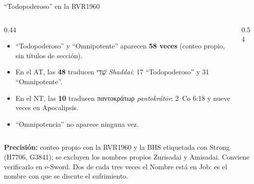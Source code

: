 \documentclass[hyperref={bookmarks=false},aspectratio=169]{beamer}
\newcommand{\heb}[1]{\mbox{\foreignlanguage{hebrew}{#1}}}
\newcommand{\grc}[1]{\foreignlanguage{ancientgreek}{#1}}
\newcommand{\destacar}[1]{\textbf{\textcolor{azul}{#1}}}
\newcommand{\precision}[1]{{\footnotesize\color{gris}\textbf{Precisión:} #1}}
\begin{document}
\begin{frame}{``Todopoderoso'' en la RVR1960}
\begin{columns}[c,onlytextwidth]
\begin{column}{0.44\textwidth}\footnotesize
\begin{itemize}
\item ``Todopoderoso'' y ``Omnipotente'' aparecen \destacar{58 veces} (conteo propio, sin títulos de sección).
\item En el AT, las \textbf{48} traducen \heb{שַׁדַּי} \emph{Shaddai}: 17 ``Todopoderoso'' y 31 ``Omnipotente''.
\item En el NT, las \textbf{10} traducen \grc{παντοκράτωρ} \emph{pantokrátōr}: 2~Co 6:18 y nueve veces en Apocalipsis.
\item ``Omnipotencia'' no aparece ninguna vez.
\end{itemize}
\end{column}
\begin{column}{0.54\textwidth}
\centering
{}
\end{column}
\end{columns}\par\smallskip
\precision{conteo propio con la RVR1960 y la BHS etiquetada con Strong (H7706, G3841); se excluyen los nombres propios Zurisadai y Amisadai. Conviene verificarlo en e-Sword. Dos de cada tres veces el Nombre está en Job: es el nombre con que se discute el sufrimiento.}
\end{frame}
\end{document}
